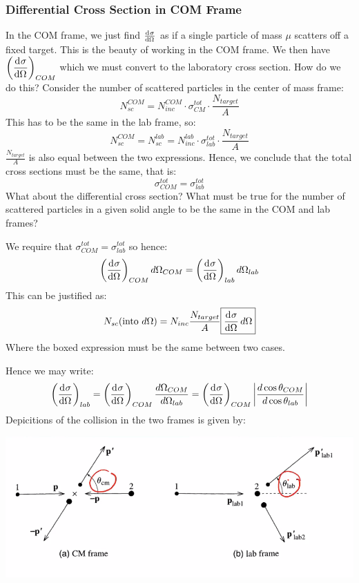 \documentclass[../PHYS306Notes.tex]{subfiles}
\begin{document}
\subsubsection{Differential Cross Section in COM Frame}
In the COM frame, we just find $\od{\sigma}{\Omega}$ as if a single particle of mass $\mu$ scatters off a fixed target. This is the beauty of working in the COM frame. We then have $\left(\dod{\sigma}{\Omega}\right)_{COM}$ which we must convert to the laboratory cross section. How do we do this? Consider the number of scattered particles in the center of mass frame: \[N_{sc}^{COM} = N_{inc}^{COM}\cdot \sigma_{CM}^{tot} \cdot \frac{N_{target}}{A}\]
This has to be the same in the lab frame, so:
\[N_{sc}^{COM} = N_{sc}^{lab} = N_{inc}^{lab}\cdot \sigma_{lab}^{tot}\cdot \frac{N_{target}}{A}\]
$\frac{N_{target}}{A}$ is also equal between the two expressions. Hence, we conclude that the total cross sections must be the same, that is:
\[\sigma_{COM}^{tot} = \sigma_{lab}^{tot}\]
What about the differential cross section? What must be true for the number of scattered particles in a given solid angle to be the same in the COM and lab frames?
\begin{s}
We require that $\sigma_{COM}^{tot} = \sigma_{lab}^{tot}$ so hence:
\[\left(\dod{\sigma}{\Omega}\right)_{COM}d\Omega_{COM} = \left(\dod{\sigma}{\Omega}\right)_{lab}d\Omega_{lab}\]
This can be justified as:
\[N_{sc}(\text{into $d\Omega$}) = N_{inc}\frac{N_{target}}{A}\boxed{\dod{\sigma}{\Omega}d\Omega}\]
Where the boxed expression must be the same between two cases.
\end{s}
Hence we may write:
\[\left(\dod{\sigma}{\Omega}\right)_{lab} = \left(\dod{\sigma}{\Omega}\right)_{COM} \frac{d\Omega_{COM}}{d\Omega_{lab}} = \left(\dod{\sigma}{\Omega}\right)_{COM}\abs{\frac{d\cos\theta_{COM}}{d\cos\theta_{lab}}}\]
Depicitions of the collision in the two frames is given by:
\begin{center}
    \includegraphics[scale=0.5]{Lecture-29/l29-img3.png}
\end{center}
\end{document}
